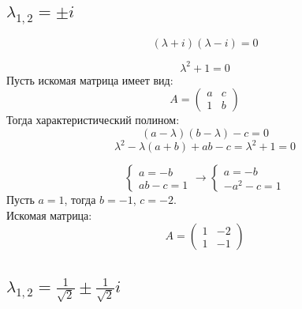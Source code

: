 \documentclass[a5paper, 10pt]{article}
\theoremstyle{definition}
\theoremstyle{plain}
\theoremstyle{remark}
\begin{document}
\subsection{$\lambda_{1, 2} = \pm i$}

\begin{equation}
\left( \lambda +  i \right)\left( \lambda - i \right)=0
\end{equation}

\begin{equation}
\lambda^2 +  1 =0
\end{equation}
Пусть искомая матрица имеет вид:
\begin{equation}
A =
\begin{pmatrix}
a & c \\
1 & b
\end{pmatrix}
\end{equation}
Тогда характеристический полином:
\begin{equation}
\left( a - \lambda \right) \left( b - \lambda \right) - c = 0
\end{equation}
\begin{equation}
\lambda^ 2 - \lambda (a + b ) + ab - c = \lambda^2 +  1 =0
\end{equation}

\begin{equation}
\begin{cases}
a = -b\\
ab - c = 1
\end{cases}
\to
\begin{cases}
a = -b\\
-a^2 - c = 1
\end{cases}
\end{equation}
Пусть $ a = 1$, тогда $b = -1$, $c = -2$.\\
Искомая матрица:
\begin{equation}
A =
\begin{pmatrix}
1 & -2 \\
1 & -1
\end{pmatrix}
\end{equation}

\subsection{$\lambda_{1, 2} = \frac{1}{\sqrt{2}} \pm \frac{1}{\sqrt{2}} i$}
\end{document}
